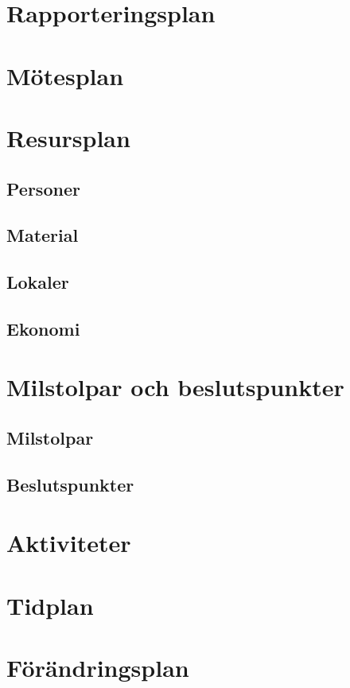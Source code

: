 \documentclass[projektplan/plan.tex]{subfiles}
\begin{document}
\section{Rapporteringsplan}

\section{Mötesplan}

\section{Resursplan}
\subsection{Personer}
\subsection{Material}
\subsection{Lokaler}
\subsection{Ekonomi}

\section{Milstolpar och beslutspunkter}
\subsection{Milstolpar}
\subsection{Beslutspunkter}

\section{Aktiviteter}

\section{Tidplan}

\section{Förändringsplan}
\end{document}
